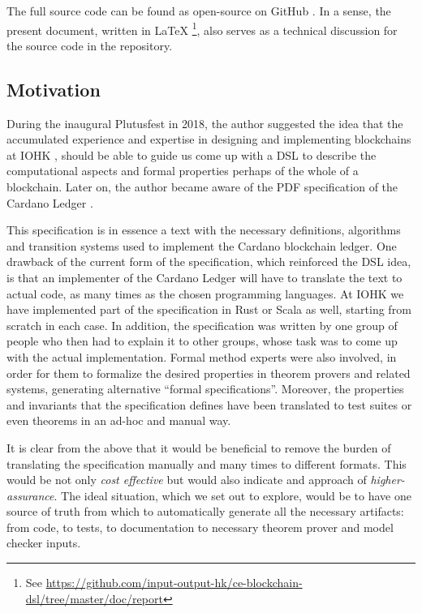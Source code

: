 \documentclass[11pt]{article}
\begin{document}
The full source code can be found as open-source on GitHub \cite{repo:code}. 
In a sense, the present document, written in \LaTeX%
\footnote{See \href{https://github.com/input-output-hk/ce-blockchain-dsl/tree/master/doc/report}{https://github.com/input-output-hk/ce-blockchain-dsl/tree/master/doc/report}}, also serves as a technical discussion for the source code in the repository.

\subsection{Motivation}
\label{sec:motivation}


During the inaugural Plutusfest \cite{site:plutusfest} in 2018, the author 
suggested the idea that the accumulated experience and expertise in designing 
and implementing blockchains at IOHK \cite{site:iohk}, should be able to 
guide us come up with a DSL to describe the computational aspects and formal 
properties perhaps of the whole of a blockchain. Later on, the author became 
aware of the PDF specification of the Cardano Ledger 
\cite{cardano:ledger-spec:shelley:2019}.

This specification is in essence a text with the necessary definitions, 
algorithms and transition systems used to implement the Cardano blockchain 
ledger. One drawback of the current form of the specification, which 
reinforced the DSL idea, is that an implementer of the Cardano Ledger will 
have to translate the text to actual code, as many times as the chosen 
programming languages. At IOHK we have implemented part of the specification 
in Rust or Scala as well, starting from scratch in each case. In addition, 
the specification was written by one group of people who then had to explain 
it to other groups, whose task was to come up with the actual implementation. 
Formal method experts were also involved, in order for them to formalize the 
desired properties in theorem provers and related systems, generating 
alternative ``formal specifications''. Moreover, the properties and 
invariants that the specification defines have been translated to test suites 
or even theorems in an ad-hoc and manual way.

It is clear from the above that it would be beneficial to remove the burden 
of translating the specification manually and many times to different 
formats. This would be not only \textit{cost effective} but would also 
indicate and approach of \textit{higher-assurance}. The ideal situation, 
which we set out to explore, would be to have one source of truth from which 
to automatically generate all the necessary artifacts: from code, to tests, 
to documentation to necessary theorem prover and model checker inputs.
\end{document}
